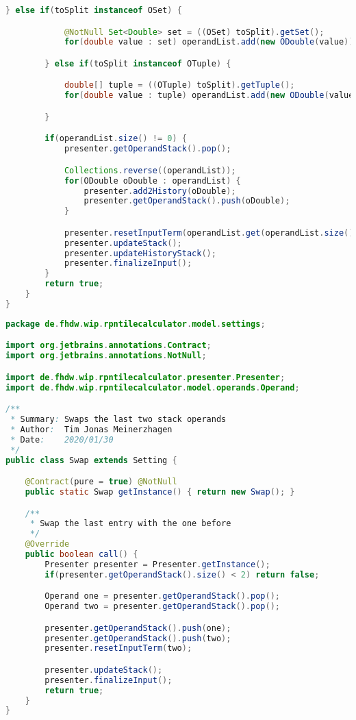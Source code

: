 \begin{lstlisting}[caption=Split (Meinerzhagen),label=list:Split,language=Java]
        } else if(toSplit instanceof OSet) {

            @NotNull Set<Double> set = ((OSet) toSplit).getSet();
            for(double value : set) operandList.add(new ODouble(value));

        } else if(toSplit instanceof OTuple) {

            double[] tuple = ((OTuple) toSplit).getTuple();
            for(double value : tuple) operandList.add(new ODouble(value));

        }

        if(operandList.size() != 0) {
            presenter.getOperandStack().pop();

            Collections.reverse((operandList));
            for(ODouble oDouble : operandList) {
                presenter.add2History(oDouble);
                presenter.getOperandStack().push(oDouble);
            }

            presenter.resetInputTerm(operandList.get(operandList.size()-1));
            presenter.updateStack();
            presenter.updateHistoryStack();
            presenter.finalizeInput();
        }
        return true;
    }
}
\end{lstlisting}    

\begin{lstlisting}[caption=Swap (Meinerzhagen),label=list:Swap,language=Java]
package de.fhdw.wip.rpntilecalculator.model.settings;

import org.jetbrains.annotations.Contract;
import org.jetbrains.annotations.NotNull;

import de.fhdw.wip.rpntilecalculator.presenter.Presenter;
import de.fhdw.wip.rpntilecalculator.model.operands.Operand;

/**
 * Summary: Swaps the last two stack operands
 * Author:  Tim Jonas Meinerzhagen
 * Date:    2020/01/30
 */
public class Swap extends Setting {

    @Contract(pure = true) @NotNull
    public static Swap getInstance() { return new Swap(); }

    /**
     * Swap the last entry with the one before
     */
    @Override
    public boolean call() {
        Presenter presenter = Presenter.getInstance();
        if(presenter.getOperandStack().size() < 2) return false;

        Operand one = presenter.getOperandStack().pop();
        Operand two = presenter.getOperandStack().pop();

        presenter.getOperandStack().push(one);
        presenter.getOperandStack().push(two);
        presenter.resetInputTerm(two);

        presenter.updateStack();
        presenter.finalizeInput();
        return true;
    }
}
\end{lstlisting}    

